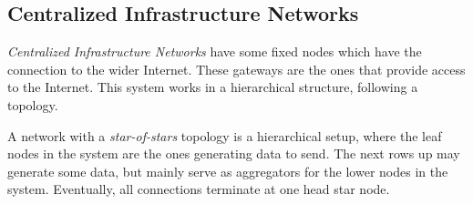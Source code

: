 \subsection{Centralized Infrastructure Networks}\label{subsec:Centralized_Infrastructure_Network}
\begin{definition}\label{def:Centralized_Infrastructure_Network}
  \emph{Centralized Infrastructure Networks} have some fixed nodes which have the connection to the wider Internet.
  These gateways are the ones that provide access to the Internet.
  This system works in a hierarchical structure, following a  topology.
\end{definition}

\begin{definition}\label{def:Star_of_Stars}
  A network with a \emph{star-of-stars} topology is a hierarchical setup, where the leaf nodes in the system are the ones generating data to send.
  The next rows up may generate some data, but mainly serve as aggregators for the lower nodes in the system.
  Eventually, all connections terminate at one head star node.
\end{definition}

